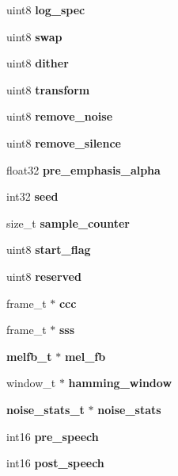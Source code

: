 \begin{DoxyCompactItemize}
uint8 {\bfseries log\+\_\+spec}
\item 
\mbox{\label{structfe__s_ab08200d2bfc6d868536d802501525179}} 
uint8 {\bfseries swap}
\item 
\mbox{\label{structfe__s_abd7b32a70dc6512134e39dd54d160689}} 
uint8 {\bfseries dither}
\item 
\mbox{\label{structfe__s_a49f2e495d938acaf5c918059e99854e2}} 
uint8 {\bfseries transform}
\item 
\mbox{\label{structfe__s_a254fc94d7868163fba6f2d8826d60fa6}} 
uint8 {\bfseries remove\+\_\+noise}
\item 
\mbox{\label{structfe__s_a8479b916c411d6d0140bf4a16eb83437}} 
uint8 {\bfseries remove\+\_\+silence}
\item 
\mbox{\label{structfe__s_aa7dc496e33955b7f06f83715c05ded8e}} 
float32 {\bfseries pre\+\_\+emphasis\+\_\+alpha}
\item 
\mbox{\label{structfe__s_a0f42573b9f0ce0247181c5dd79e16b67}} 
int32 {\bfseries seed}
\item 
\mbox{\label{structfe__s_a40c006f7494fdad56833d5fd7ccf6904}} 
size\+\_\+t {\bfseries sample\+\_\+counter}
\item 
\mbox{\label{structfe__s_aa05ae3633c2b33e77a7b8b90e769176b}} 
uint8 {\bfseries start\+\_\+flag}
\item 
\mbox{\label{structfe__s_a18670c79bc0cd9848fdf4711c5094542}} 
uint8 {\bfseries reserved}
\item 
\mbox{\label{structfe__s_afc472de43bd747de659dd57bc9a74fae}} 
frame\+\_\+t $\ast$ {\bfseries ccc}
\item 
\mbox{\label{structfe__s_a6525c59397073d363e1844c28746fcb9}} 
frame\+\_\+t $\ast$ {\bfseries sss}
\item 
\mbox{\label{structfe__s_ae5a054dbac5e32cf028b6d6d4c9391bd}} 
\textbf{ melfb\+\_\+t} $\ast$ {\bfseries mel\+\_\+fb}
\item 
\mbox{\label{structfe__s_ad47433337a370e452070ffddce87e474}} 
window\+\_\+t $\ast$ {\bfseries hamming\+\_\+window}
\item 
\mbox{\label{structfe__s_a6b1303b8c74a676ca9dcc9adc07033e9}} 
\textbf{ noise\+\_\+stats\+\_\+t} $\ast$ {\bfseries noise\+\_\+stats}
\item 
\mbox{\label{structfe__s_a2bcaff6bbc8ee6e990a7092bd0d22771}} 
int16 {\bfseries pre\+\_\+speech}
\item 
\mbox{\label{structfe__s_a46c8eab758b1a737ccc5ef4654e42f6c}} 
int16 {\bfseries post\+\_\+speech}
\item 
\mbox{\label{structfe__s_a93290323d05eb26e0dfe423a9b27063a}} 

\end{DoxyCompactItemize}
